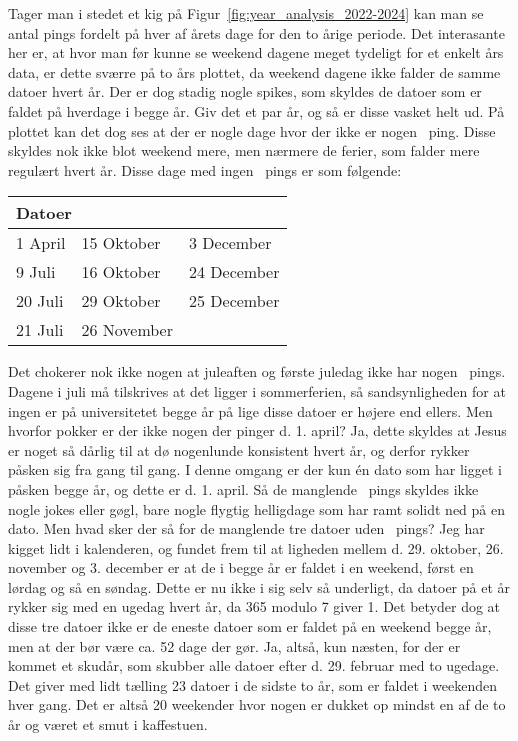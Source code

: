 \begin{article}
Tager man i stedet et kig på Figur~\ref{fig:year_analysis_2022-2024} kan man se antal pings fordelt på hver af årets dage for den to årige periode. Det interasante her er, at hvor man før kunne se weekend dagene meget tydeligt for et enkelt års data, er dette sværre på to års plottet, da weekend dagene ikke falder de samme datoer hvert år. Der er dog stadig nogle spikes, som skyldes de datoer som er faldet på hverdage i begge år. Giv det et par år, og så er disse vasket helt ud.
På plottet kan det dog ses at der er nogle dage hvor der ikke er nogen \coffee\ ping. Disse skyldes nok ikke blot weekend mere, men nærmere de ferier, som falder mere regulært hvert år.
Disse dage med ingen \coffee\ pings er som følgende:
\begin{center}
	\begin{tabular}{l|l|l}
		\multicolumn{3}{l}{Datoer} \\ \hline
		\phantom{3}1 April & 15 Oktober & \phantom{3}3 December \\ 
		\phantom{3}9 Juli & 16 Oktober & 24 December \\ 
		20 Juli & 29 Oktober & 25 December \\
		21 Juli & 26 November & 
	\end{tabular}
\end{center}
Det chokerer nok ikke nogen at juleaften og første juledag ikke har nogen \coffee\ pings.
Dagene i juli må tilskrives at det ligger i sommerferien, så sandsynligheden for at ingen er på universitetet begge år på lige disse datoer er højere end ellers.
Men hvorfor pokker er der ikke nogen der pinger d. 1. april? Ja, dette skyldes at Jesus er noget så dårlig til at dø nogenlunde konsistent hvert år, og derfor rykker påsken sig fra gang til gang. I denne omgang er der kun én dato som har ligget i påsken begge år, og dette er d. 1. april. Så de manglende \coffee\ pings skyldes ikke nogle jokes eller gøgl, bare nogle flygtig helligdage som har ramt solidt ned på en dato.
Men hvad sker der så for de manglende tre datoer uden \coffee\ pings?
Jeg har kigget lidt i kalenderen, og fundet frem til at ligheden mellem d. 29. oktober, 26. november og 3. december er at de i begge år er faldet i en weekend, først en lørdag og så en søndag. Dette er nu ikke i sig selv så underligt, da datoer på et år rykker sig med en ugedag hvert år, da 365 modulo 7 giver 1. Det betyder dog at disse tre datoer ikke er de eneste datoer som er faldet på en weekend begge år, men at der bør være ca. 52 dage der gør. Ja, altså, kun næsten, for der er kommet et skudår, som skubber alle datoer efter d. 29. februar med to ugedage. Det giver med lidt tælling 23 datoer i de sidste to år, som er faldet i weekenden hver gang. Det er altså 20 weekender hvor nogen er dukket op mindst en af de to år og været et smut i kaffestuen.



\end{article}

